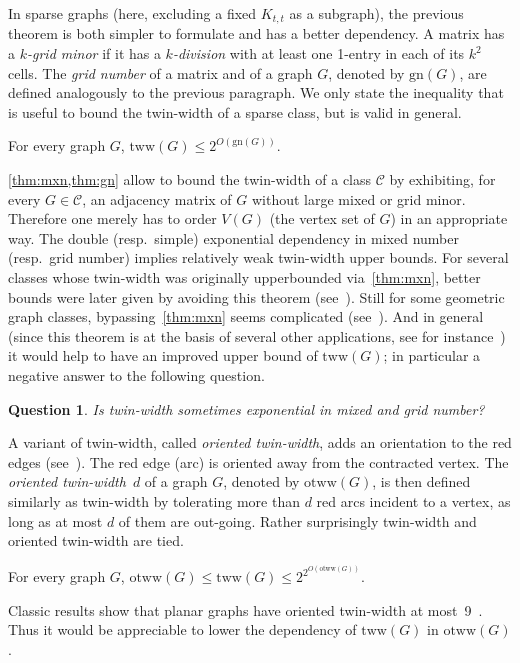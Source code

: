 \documentclass[a4paper,UKenglish,cleveref,hyperref,autoref]{lipics-v2021}
\newtheorem{question}{Question}%
\newcommand{\tww}{\text{tww}}
\newcommand{\otww}{\text{otww}}
\newcommand{\gn}{\text{gn}}
\begin{document}
In sparse graphs (here, excluding a fixed $K_{t,t}$ as a subgraph), the previous theorem is both simpler to formulate and has a better dependency.
A matrix has a \emph{$k$-grid minor} if it has a \emph{$k$-division} with at least one 1-entry in each of its $k^2$ cells.
The \emph{grid number} of a matrix and of a graph $G$, denoted by $\gn(G)$, are defined analogously to the previous paragraph.
We only state the inequality that is useful to bound the twin-width of a sparse class, but is valid in general.
\begin{theorem}\label{thm:gn}
  For every graph $G$, $\tww(G) \leqslant 2^{O(\gn(G))}$.
\end{theorem}
\cref{thm:mxn,thm:gn} allow to bound the twin-width of a class $\mathcal C$ by exhibiting, for every $G \in \mathcal C$, an adjacency matrix of $G$ without large mixed or grid minor.
Therefore one merely has to order $V(G)$ (the vertex set of $G$) in an appropriate way.
The double (resp.~simple) exponential dependency in mixed number (resp.~grid number) implies relatively weak twin-width upper bounds.
For several classes whose twin-width was originally upperbounded via~\cref{thm:mxn}, better bounds were later given by avoiding this theorem (see~\cite{twin-width2,Balaban21,Jacob22,reduced-bdw,Berge21}).
Still for some geometric graph classes, bypassing~\cref{thm:mxn} seems complicated (see~\cite{twin-width8}).
And in general (since this theorem is at the basis of several other applications, see for instance~\cite{twin-width2,twin-width3,twin-width4}) it would help to have an improved upper bound of $\tww(G)$; in particular a negative answer to the following question.

\begin{question}\label{q:mxn-gn}
  Is twin-width sometimes exponential in mixed and grid number?
\end{question}

A variant of twin-width, called \emph{oriented twin-width}, adds an orientation to the red edges (see~\cite{twin-width6}). 
The red edge (arc) is oriented away from the contracted vertex.
The \emph{oriented twin-width}~$d$ of a graph $G$, denoted by $\otww(G)$, is then defined similarly as twin-width by tolerating more than $d$ red arcs incident to a vertex, as long as at most $d$ of them are out-going.
Rather surprisingly twin-width and oriented twin-width are tied.

\begin{theorem}\label{thm:otww}
  For every graph $G$, $\otww(G) \leqslant \tww(G) \leqslant 2^{2^{O(\otww(G))}}$.
\end{theorem}
Classic results show that planar graphs have oriented twin-width at most~9~\cite{twin-width6}.
Thus it would be appreciable to lower the dependency of $\tww(G)$ in $\otww(G)$.
\end{document}
